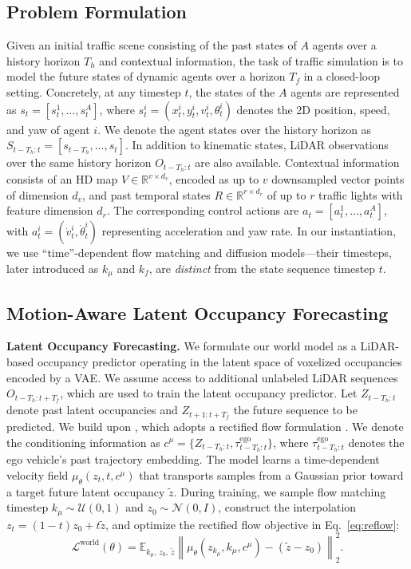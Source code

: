 \documentclass[runningheads]{llncs}
\begin{document}
\subsection{Problem Formulation} \label{Problem_Formulation}
Given an initial traffic scene consisting of the past states of $A$ agents over a history horizon $T_h$ and contextual information, the task of traffic simulation is to model the future states of dynamic agents over a horizon $T_f$ in a closed-loop setting. Concretely, at any timestep $t$, the states of the $A$ agents are represented as $s_t = [s_t^1, \ldots, s_t^A]$, where $s_t^i = (x_t^i, y_t^i, v_t^i, \theta_t^i)$ denotes the 2D position, speed, and yaw of agent $i$. We denote the agent states over the history horizon as $S_{t-T_h:t} = [s_{t-T_h}, \ldots,s_t]$. In addition to kinematic states, LiDAR observations over the same history horizon $O_{t-T_h:t}$ are also available. Contextual information consists of an HD map $V \in \mathbb{R}^{v \times d_v}$, encoded as up to $v$ downsampled vector points of dimension $d_v$, and past temporal states $R \in \mathbb{R}^{r \times d_r}$ of up to $r$ traffic lights with feature dimension $d_r$. The corresponding control actions are $a_t = [a_t^1, \ldots, a_t^A]$, with $a_t^i = (\dot{v}_t^i, \dot{\theta}_t^i)$ representing acceleration and yaw rate. In our instantiation, we use ``time''-dependent flow matching and diffusion models---their timesteps, later introduced as $k_\mu$ and $k_f$, are \emph{distinct} from the state sequence timestep $t$.


\subsection{Motion-Aware Latent Occupancy Forecasting} \label{WM}

\textbf{Latent Occupancy Forecasting.}
We formulate our world model as a LiDAR-based occupancy predictor operating in the latent space of voxelized occupancies encoded by a VAE. We assume access to additional unlabeled LiDAR sequences $O_{t-T_h: t+T_f}$, which are used to train the latent occupancy predictor. Let $Z_{t-T_h:t}$ denote past latent occupancies and $Z_{t+1:t+T_f}$ the future sequence to be predicted. We build upon \cite{liu2025foundationallidarworldmodels}, which adopts a rectified flow formulation \cite{liu2022flow}. We denote the conditioning information as 
$c^\mu = \{Z_{t-T_h:t}, \tau_{t-T_h:t}^{\text{ego}}\}$,
where $\tau_{t-T_h:t}^{\text{ego}}$ denotes the ego vehicle's past trajectory embedding. The model learns a time-dependent velocity field $\mu_\theta(z_t, t, c^\mu)$ that transports samples from a Gaussian prior toward a target future latent occupancy $\tilde{z}$. During training, we sample flow matching timestep $k_\mu \sim \mathcal{U}(0,1)$ and $z_0 \sim \mathcal{N}(0,I)$, construct the interpolation $z_t = (1-t)z_0 + t\tilde{z}$, and optimize the rectified flow objective in Eq.~\ref{eq:reflow}:
\begin{equation}
\label{eq:reflow}
\mathcal{L}^{\text{world}}(\theta)
=
\mathbb{E}_{k_\mu,\, z_0,\, \tilde{z}}
\left\|
\mu_\theta(z_{k_\mu}, k_\mu, c^\mu) - (\tilde{z} - z_0)
\right\|_2^2 .
\end{equation}
\end{document}
